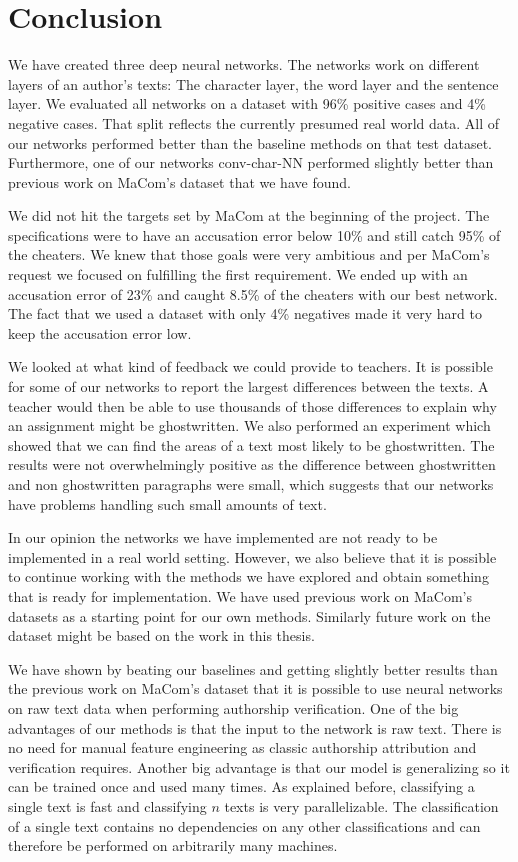 \section{Conclusion} \label{sec:conclusion}

We have created three deep neural networks. The networks work on different
layers of an author's texts: The character layer, the word layer and the
sentence layer. We evaluated all networks on a dataset with 96\% positive cases
and 4\% negative cases. That split reflects the currently presumed real world
data. All of our networks performed better than the baseline methods on that
test dataset. Furthermore, one of our networks \gls{conv-char-NN} performed
slightly better than previous work on MaCom's dataset that we have found.

We did not hit the targets set by MaCom at the beginning of the project. The
specifications were to have an accusation error below 10\% and still catch 95\%
of the cheaters. We knew that those goals were very ambitious and per MaCom's
request we focused on fulfilling the first requirement. We ended up with an
accusation error of 23\% and caught 8.5\% of the cheaters with our best network.
The fact that we used a dataset with only 4\% negatives made it very hard to
keep the accusation error low.

We looked at what kind of feedback we could provide to teachers. It is possible
for some of our networks to report the largest differences between the texts.
A teacher would then be able to use thousands of those differences to explain
why an assignment might be ghostwritten. We also performed an experiment which
showed that we can find the areas of a text most likely to be ghostwritten. The
results were not overwhelmingly positive as the difference between ghostwritten
and non ghostwritten paragraphs were small, which suggests that our networks
have problems handling such small amounts of text.

In our opinion the networks we have implemented are not ready to be implemented
in a real world setting. However, we also believe that it is possible to
continue working with the methods we have explored and obtain something that is
ready for implementation. We have used previous work on MaCom's datasets as a
starting point for our own methods. Similarly future work on the dataset might
be based on the work in this thesis.

We have shown by beating our baselines and getting slightly better results
than the previous work on MaCom's dataset that it is possible to use neural
networks on raw text data when performing authorship verification. One of
the big advantages of our methods is that the input to the network is raw
text. There is no need for manual feature engineering as classic authorship
attribution and verification requires. Another big advantage is that our model
is generalizing so it can be trained once and used many times. As explained
before, classifying a single text is fast and classifying $n$ texts is very
parallelizable. The classification of a single text contains no dependencies on
any other classifications and can therefore be performed on arbitrarily many
machines.

